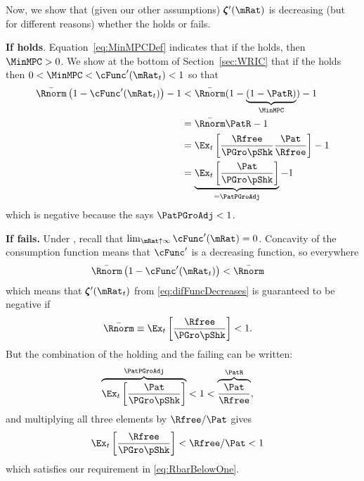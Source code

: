 \documentclass[\econtexRoot/BufferStockTheory]{subfiles}
\begin{document}
Now, we show that (given our other assumptions) $\difFunc^{\prime}(\mRat)$ is decreasing (but for different reasons) whether the {\RIC} holds or fails.

\textbf{If {\RIC} holds}. Equation~\eqref{eq:MinMPCDef} indicates that if the {\RIC} holds, then $\MinMPC >0$.  We show at the bottom of Section~\ref{sec:WRIC} that if the {\RIC} holds then $0 < \MinMPC < \cFunc^{\prime}(\mRat_{t}) < 1$ so that 
\begin{align*}
  \bar{\Rnorm}\left(1-\cFunc^{\prime}({\mRat}_t)\right) - 1 & <  \bar{\Rnorm}(1-\underbrace{(1-\PatR)}_{\MinMPC}) - 1  \\
                                                            & = \bar{\Rnorm}\PatR - 1 \\
                                                            & = \Ex_{t}\left[\frac{\Rfree}{\PGro \pShk}\frac{\Pat}{\Rfree}\right] - 1 \\
                                                            & = \underbrace{\Ex_{t}\left[\frac{\Pat}{\PGro \pShk}\right]}_{= \PatPGroAdj} - 1 
\end{align*}
which is negative because the {\GICNrm} says $\PatPGroAdj < 1$.  

\textbf{If {\RIC} fails.}
Under \cncl{\RIC}, recall that $\lim_{\mRat \uparrow \infty} \cFunc^{\prime}(\mRat) = 0$.  Concavity of the consumption function means that $\cFunc^{\prime}$ is a decreasing function, so everywhere 
\begin{align*}
  \bar{\Rnorm}\left(1-\cFunc^{\prime}({\mRat}_t)\right) & < \bar{\Rnorm}
\end{align*}
which means that $\difFunc^{\prime}(\mRat_{t})$ from \eqref{eq:difFuncDecreases} is guaranteed to be negative if
\begin{align}
  \bar{\Rnorm} \equiv \Ex_{t}\left[\frac{\Rfree}{\PGro \pShk}\right] & < 1  \label{eq:RbarBelowOne}.
\end{align}
But the combination of the {\GICNrm} holding and the {\RIC} failing can be written:
\begin{align*}
  \overbrace{\Ex_{t}\left[\frac{\Pat}{\PGro \pShk}\right]}^{\PatPGroAdj} & < 1 < \overbrace{\frac{\Pat}{\Rfree}}^{{\PatR}},
\end{align*}
and multiplying all three elements by $\Rfree/\Pat$ gives 
\begin{align*}
  \Ex_{t}\left[\frac{\Rfree}{\PGro \pShk}\right] & < \Rfree/\Pat < 1
\end{align*}
which satisfies our requirement in \eqref{eq:RbarBelowOne}.
\end{document}
